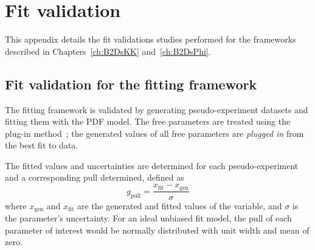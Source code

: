 \chapter{Fit validation}
\label{ch:appendix_toys}

This appendix details the fit validations studies performed for the frameworks described in Chapters~\ref{ch:B2DsKK} and~\ref{ch:B2DsPhi}. 

\section{Fit validation for the \decay{\Bp}{\Dsp\Kp\Km} fitting framework}
\label{sec:app_toys_B2DsKK}


The \decay{\Bp}{\Dsp\Kp\Km} fitting framework is validated by generating pseudo-experiment datasets and fitting them with the PDF model. The free parameters are treated using the plug-in method~\cite{plugin}; the generated values of all free parameters are \emph{plugged in} from the best fit to data.      

The fitted values and uncertainties are determined for each pseudo-experiment and a corresponding pull determined, defined as
\begin{equation}
g_{\text{pull}} = \frac{x_{\text{fit}} - x_{\text{gen}} }{\sigma}
\end{equation}
where $x_{\text{gen}}$ and $x_{\text{fit}}$ are the generated and fitted values of the variable, and $\sigma$ is the parameter's uncertainty.
For an ideal unbiased fit model, the pull of each parameter of interest would be normally distributed with unit width and mean of zero.  


